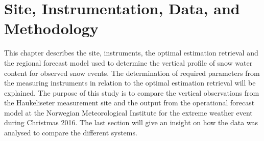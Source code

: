 \chapter{Site, Instrumentation, Data, and Methodology}\label{ch:Methods}

This chapter describes the site, instruments, the optimal estimation retrieval and the regional forecast model used to determine the vertical profile of snow water content for observed snow events. 
The determination of required parameters from the measuring instruments in relation to the optimal estimation retrieval will be explained. The purpose of this study is to compare the vertical observations from the Haukeliseter measurement site and the output from the operational forecast model at the Norwegian Meteorological Institute for the extreme weather event during Christmas 2016. 
The last section will give an insight on how the data was analysed to compare the different systems. 











